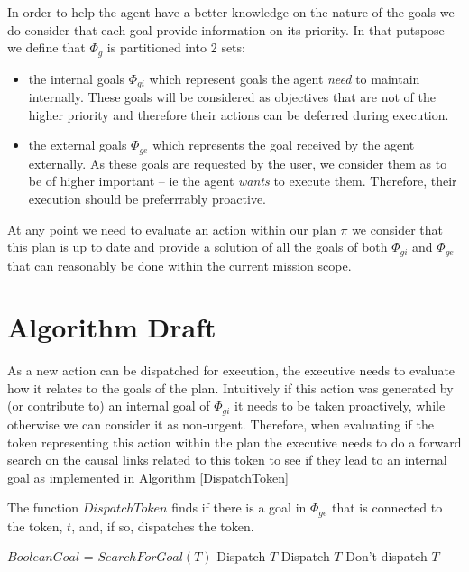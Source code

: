 In order to help the agent have a better knowledge on the nature of
the goals we do consider that each goal provide information on its
priority. In that putspose we define that $\Phi_g$ is partitioned into
2 sets:
\begin{itemize}
\item the internal goals $\Phi_{gi}$ which represent goals the agent
  {\em need} to maintain internally. These goals will be considered 
  as objectives that are not of the higher priority and therefore
  their actions can be deferred during execution.
\item the external goals $\Phi_{ge}$ which represents the goal
  received by the agent externally. As these goals are requested by
  the user, we consider them as to be of higher important -- ie the
  agent {\em wants} to execute them. Therefore, their execution should
  be preferrrably proactive.
\end{itemize}

At any point we need to evaluate an action within our plan $\pi$ we
consider that this plan is up to date and provide a solution of all 
the goals of both $\Phi_{gi}$ and $\Phi_{ge}$ that can reasonably  be
done within the current mission scope.


\section{Algorithm Draft}

As a new action can be dispatched for execution, the executive
needs to evaluate how it relates to the goals of the plan. Intuitively
if this action was generated by (or contribute to) an internal goal of
$\Phi_{gi}$ it needs to be taken proactively, while otherwise we can 
consider it as non-urgent. Therefore, when evaluating if the token
representing this action  within the plan the executive needs to do a
forward search on the causal links related to this token to see if
they lead to an internal goal as implemented in Algorithm \ref{DispatchToken}


\begin{algorithm}
\caption{The function $DispatchToken$ finds if there is a goal in $\Phi_{ge}$ that is connected
to the token, $t$, and, if so, dispatches the token.}
\label{DispatchToken}
\begin{algorithmic}
\State $Boolean Goal$ = $SearchForGoal( T )$
	\State \Return Dispatch $T$
	\State \Return Dispatch $T$
\Else
	\State \Return Don't dispatch $T$
\EndIf
\EndFunction
\end{algorithmic}
\end{algorithm}

